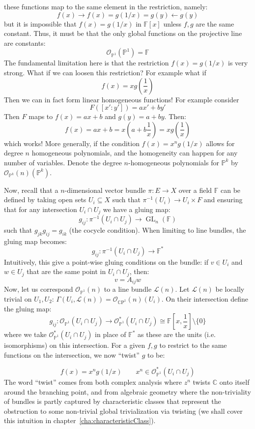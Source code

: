 \documentclass{book}
\newcommand{\F}{{\mathbb{F}}}
\newcommand{\C}{{\mathbb{C}}}
\renewcommand{\P}{{\mathbb{P}}}
\newcommand{\CL}{{\mathcal{L}}}
\newcommand{\CO}{{\mathcal{O}}}
\newcommand{\CP}{{\mathbb{C}\mathrm{P}}}
\newcommand{\sse}{\subseteq}
\newcommand{\GL}{{\operatorname{GL}}}
\begin{document}
these functions map to the same element in the restriction, namely:
\[
  f(x) \to f(x) = g(1/x) = g(y) \leftarrow g(y)
\]
but it is impossible that $f(x) = g(1/x)$ in $\F[x]$ unless $f,g$ are the same constant. Thus, it must be that the only
global functions on the projective line are constants:
\[
  \CO_{\P^1}(\P^1) = \F
\]
The fundamental limitation here is that the restriction $f(x) = g(1/x)$ is very strong. What if we can loosen
this restriction? For example what if
\[
  f(x) = xg\left(\frac{1}{x}\right)
\]
Then we can in fact form linear homogeneous functions! For example consider
\[
  F([x':y']) = ax'+by'
\]
Then $F$ maps to $f(x) = ax+b$ and $g(y) = a + by$. Then:
\[
  f(x)= ax+b = x\left(a + b \frac{1}{x}\right)  = xg\left(\frac{1}{x}\right)
\]
which works! More generally, if the condition $f(x) = x^ng(1/x)$ allows for degree $n$ homogeneous
polynomials, and the homogeneity can happen for any number of variables. Denote the degree $n$-homogeneous
polynomials for $\P^k$ by $\CO_{\P^k}(n)(\P^k)$.

Now, recall that a $n$-dimensional vector bundle $\pi: E \to X$ over a field $\F$ can be defined by taking open
sets $U_i \sse X$ such that $\pi^{-1}(U_i) \to U_i\times F$ and ensuring that for any intersection $U_i\cap
U_j$ we have a gluing map:
\[
  g_{ij}: \pi^{-1}(U_i\cap U_j) \to \GL_n(\F)
\]
such that $g_{jk}g_{ij} = g_{ik}$ (the cocycle condition). When limiting
to line bundles, the gluing map becomes:
\[
  g_{ij}: \pi^{-1}(U_i\cap U_j) \to \F^*
\]
Intuitively, this give a point-wise gluing conditions on the bundle: if $v \in U_i$ and $w \in U_j$ that are
the same point in $U_i\cap U_j$, then:
\[
  v = A_{ij}w
\]
Now, let us correspond $\CO_{\P^1}(n)$ to a line bundle $\CL(n)$. Let $\CL(n)$ be
locally trivial on $U_1, U_2$: $\Gamma(U_i, \CL(n)) = \CO_{\CP^1}(n)(U_i)$. On their intersection define the gluing
map: \[ g_{ij}: \CO_{\P^1}(U_i\cap U_j) \to \CO_{\P^1}^*(U_i\cap U_j) \cong \F\left[x,
\frac{1}{x}\right]\setminus\{0\} \] where we take $\CO_{\P^1}^*(U_i\cap U_j)$ in place of $\F^*$ as these are
the units (i.e. isomorphisms) on this intersection. For a given $f,g$ to restrict to the same functions on
the intersection, we now ``twist'' $g$ to be:

\[
  f(x) = x^ng(1/x) \qquad x^n \in \CO_{\P^1}^*(U_i\cap U_j)
\]
The word ``twist'' comes from both complex analysis where $z^n$ twists $\C$ onto itself around the branching
point, and from algebraic geometry where the non-triviality of bundles is partly captured by characteristic
classes that represent the obstruction to some non-trivial global trivialization via twisting (we shall cover
this intuition in chapter~\ref{cha:characteristicClass}).
\end{document}
